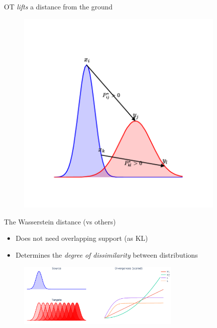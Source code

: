 \documentclass[pdf,aspectratio=169,10pt]{beamer}
\begin{document}
\begin{frame}{OT \emph{lifts} a distance from the ground}
\begin{minipage}{0.4\textwidth}
\begin{figure}
            \includegraphics[trim={2cm 2cm 2cm 2cm},clip, width=0.9\textwidth]{../img/horizontal_distance.pdf}
        \end{figure}
        \centering
        \small
    \end{minipage}
    
\end{frame}

\begin{frame}{The Wasserstein distance (vs others)}
    \begin{itemize}
        \item Does not need overlapping support (as KL)
        \item Determines the \emph{degree of dissimilarity} between distributions
    \end{itemize}
    \begin{figure}
        \centering
            \includegraphics[trim={0 0 0 0},clip, width=0.7\textwidth]{../img/wasserstein_1d.pdf}
        \end{figure}
        \centering
        \small

\end{frame}
\end{document}
